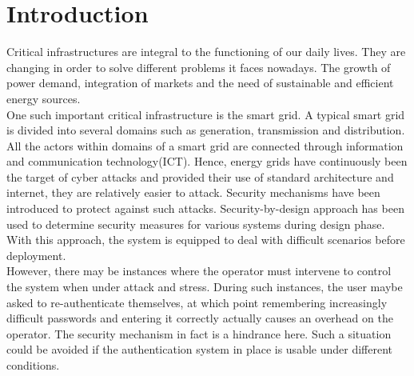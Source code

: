 \section{Introduction}

Critical infrastructures are integral to the functioning of our daily lives. They are changing in order to solve different problems it faces nowadays. The growth of power demand, integration of markets and the need of sustainable and efficient energy sources. \\
One such important critical infrastructure is the smart grid. A typical smart grid is divided into several domains such as generation, transmission and distribution. All the actors within domains of a smart grid are connected through information and communication technology(ICT). Hence, energy grids have continuously been the target of cyber attacks and provided their use of standard architecture and internet, they are relatively easier to attack. Security mechanisms have been introduced to protect against such attacks. Security-by-design approach has been used to determine security measures for various systems during design phase. With this approach, the system is equipped to deal with difficult scenarios before deployment. \\ However, there may be instances where the operator must intervene to control the system when under attack and stress. During such instances, the user maybe asked to re-authenticate themselves, at which point remembering increasingly difficult passwords and entering it correctly actually causes an overhead on the operator. The security mechanism in fact is a hindrance here. Such a situation could be avoided if the authentication system in place is usable under different conditions. 


